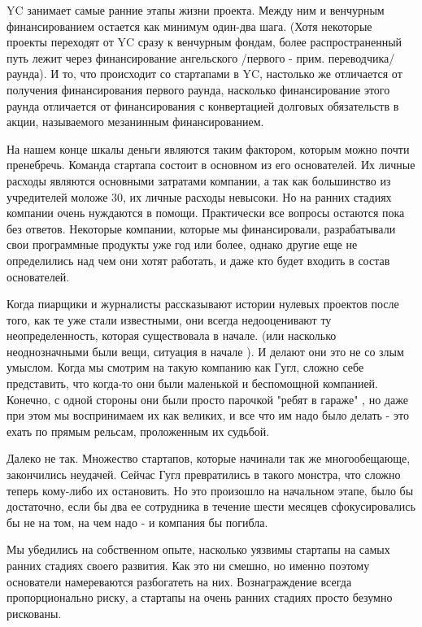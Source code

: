 \documentclass[ebook,12pt,oneside,openany]{memoir}
\begin{document}
YC занимает самые ранние этапы жизни проекта. Между ним и венчурным
финансированием остается как минимум один-два шага. (Хотя некоторые
проекты переходят от YC сразу к венчурным фондам, более
распространенный путь лежит через финансирование ангельского /первого
- прим. переводчика/ раунда). И то, что происходит со стартапами в YC,
настолько же отличается от получения финансирования первого раунда,
насколько финансирование этого раунда отличается от финансирования с
конвертацией долговых обязательств в акции, называемого мезанинным
финансированием.

На нашем конце шкалы деньги являются таким фактором, которым можно
почти пренебречь. Команда стартапа состоит в основном из его
основателей. Их личные расходы являются основными затратами компании,
а так как большинство из учредителей моложе 30, их личные расходы
невысоки. Но на ранних стадиях компании очень нуждаются в помощи.
Практически все вопросы остаются пока без ответов. Некоторые компании,
которые мы финансировали, разрабатывали свои программные продукты уже
год или более, однако другие еще не определились над чем они хотят
работать, и даже кто будет входить в состав основателей.

Когда пиарщики и журналисты рассказывают истории нулевых проектов
после того, как те уже стали известными, они всегда недооценивают ту
неопределенность, которая существовала в начале. (или насколько
неоднозначными были вещи, ситуация в начале ). И делают они это не со
злым умыслом. Когда мы смотрим на такую компанию как Гугл, сложно себе
представить, что когда-то они были маленькой и беспомощной компанией.
Конечно, с одной стороны они были просто парочкой "ребят в гараже" ,
но даже при этом мы воспринимаем их как великих, и все что им надо
было делать - это ехать по прямым рельсам, проложенным их судьбой.

Далеко не так. Множество стартапов, которые начинали так же
многообещающе, закончились неудачей. Сейчас Гугл превратились в такого
монстра, что сложно теперь кому-либо их остановить. Но это произошло
на начальном этапе, было бы достаточно, если бы два ее сотрудника в
течение шести месяцев сфокусировались бы не на том, на чем надо - и
компания бы погибла.

Мы убедились на собственном опыте, насколько уязвимы стартапы на самых
ранних стадиях своего развития. Как это ни смешно, но именно поэтому
основатели намереваются разбогатеть на них. Вознаграждение всегда
пропорционально риску, а стартапы на очень ранних стадиях просто
безумно рискованы.
\end{document}
